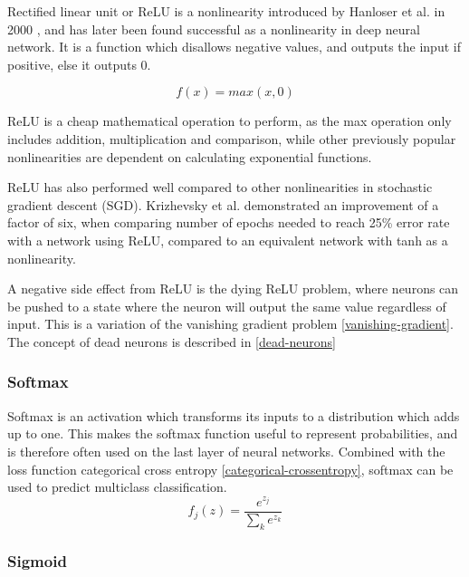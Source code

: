 Rectified linear unit or ReLU is a nonlinearity introduced by Hanloser et al. in 2000 \cite{smith_scientist_1997}, and has later been found successful as a nonlinearity in deep neural network. It is a function which disallows negative values, and outputs the input if positive, else it outputs 0.

\begin{equation} \label{eqn:relu}
    f(x) = max(x, 0)
\end{equation}

ReLU is a cheap mathematical operation to perform, as the max operation only includes addition, multiplication and comparison, while other previously popular nonlinearities are dependent on calculating exponential functions. 

ReLU has also performed well compared to other nonlinearities in stochastic gradient descent (SGD). Krizhevsky et al. demonstrated an improvement of a factor of six, when comparing number of epochs needed to reach 25\% error rate with a network using ReLU, compared to an equivalent network with tanh as a nonlinearity. \cite{krizhevsky_imagenet_2012}

A negative side effect from ReLU is the dying ReLU problem, where neurons can be pushed to a state where the neuron will output the same value regardless of input. This is a variation of the vanishing gradient problem \ref{vanishing-gradient}. The concept of dead neurons is described in \ref{dead-neurons}\cite{zeiler_rectified_2013}

\subsubsection{Softmax}

Softmax is an activation which transforms its inputs to a distribution which adds up to one. This makes the softmax function useful to represent probabilities, and is therefore often used on the last layer of neural networks. Combined with the loss function categorical cross entropy \ref{categorical-crossentropy}, softmax can be used to predict multiclass classification.\cite{_cs231n_????-1}
\begin{equation} \label{eqn:softmax}
    f_j(z) = \frac{e^{z_j}}{\sum_k e^{z_k}}
\end{equation}



\subsubsection{Sigmoid}

